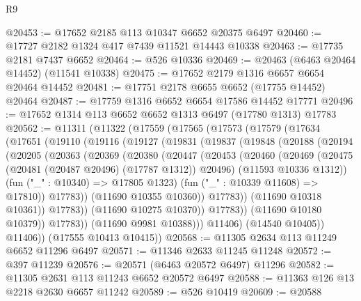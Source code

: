 \begin{lexlean}{R9}
\begin{coremodule}
{{{{{{{{{{{{{{{{{{{{{{{{{{{{{{{{{{{{{{{{{{{{{{{{{{{{{{{{{{{{{{{{{{{{{{{{{{{{{{{{{{{{@20453 := @17652 @2185 @113 @10347 @6652 @20375 @6497
@20460 := @17727 @2182 @1324 @417 @7439 @11521 @14443 @10338
@20463 := @17735 @2181 @7437 @6652
@20464 := @526 @10336
@20469 := @20463 (@6463 @20464 @14452) (@11541 @10338)
@20475 := @17652 @2179 @1316 @6657 @6654 @20464 @14452
@20481 := @17751 @2178 @6655 @6652 (@17755 @14452) @20464
@20487 := @17759 @1316 @6652 @6654 @17586 @14452 @17771
@20496 := @17652 @1314 @113 @6652 @6652 @1313 @6497 (@17780 @1313) @17783
@20562 := @11311
    (@11322
      (@17559
        (@17565
          (@17573
            (@17579
              (@17634
                (@17651
                  (@19110
                    (@19116
                      (@19127
                        (@19831
                          (@19837
                            (@19848
                              (@20188
                                (@20194
                                  (@20205
                                    (@20363
                                      (@20369
                                        (@20380
                                          (@20447
                                            (@20453
                                              (@20460
                                                (@20469
                                                  (@20475
                                                    (@20481 (@20487 @20496) (@17787 @1312))
                                                    @20496)
                                                  (@11593 @10336 @1312))
                                                (fun ("_" : @10340) => @17805 @1323)
                                                (fun ("_" : @10339 @11608) => @17810))
                                              @17783))
                                          (@11690 @10355 @10360))
                                        @17783))
                                    (@11690 @10318 @10361))
                                  @17783))
                              (@11690 @10275 @10370))
                            @17783))
                        (@11690 @10180 @10379))
                      @17783))
                  (@11690 @9981 @10388)))
              @11406)
            (@14540 @10405))
          @11406))
      (@17555 @10413 @10415))
@20568 := @11305 @2634 @113 @11249 @6652 @11296 @6497
@20571 := @11346 @2633 @11245 @11248
@20572 := @397 @11239
@20576 := @20571 (@6463 @20572 @6497) @11296
@20582 := @11305 @2631 @113 @11243 @6652 @20572 @6497
@20588 := @11363 @126 @13 @2218 @2630 @6657 @11242
@20589 := @526 @10419
@20609 := @20588
}}}}}}}}}}}}}}}}}}}}}}}}}}}}}}}}}}}}}}}}}}}}}}}}}}}}}}}}}}}}}}}}}}}}}}}}}}}}}}}}}}}}
\end{coremodule}
\end{lexlean}
